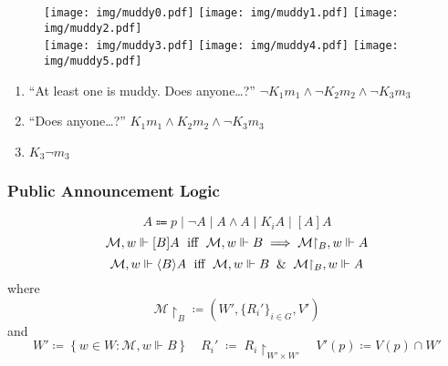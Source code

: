 \documentclass[UTF8,aspectratio=43,11pt,colorlinks,compress,openany]{beamer}%
\begin{document}
\begin{frame}\frametitle{}
\begin{figure}[H]
\texttt{[image: img/muddy0.pdf]}
\texttt{[image: img/muddy1.pdf]}
\texttt{[image: img/muddy2.pdf]}\\
\texttt{[image: img/muddy3.pdf]}
\texttt{[image: img/muddy4.pdf]}\hspace*{2ex}
\texttt{[image: img/muddy5.pdf]}
\end{figure}
\begin{enumerate}
	\item ``At least one is muddy. Does anyone\dots?'' $\neg K_1m_1\wedge\neg K_2m_2\wedge\neg K_3m_3$
	\item ``Does anyone\dots?'' $K_1m_1\wedge K_2m_2\wedge\neg K_3m_3$
	\item $K_3\neg m_3$
\end{enumerate}
\end{frame}

\begin{frame}\frametitle{Public Announcement Logic}
\[A\Coloneqq p\mid \neg A\mid A\wedge A\mid K_i A\mid [A]A\]
\[\mathcal{M},w\Vdash[B]A \mbox{\; iff \;} \mathcal{M},w\Vdash B\implies\mathcal{M}{\restriction_B},w\Vdash A\]
\[\mathcal{M},w\Vdash\langle B\rangle A \mbox{\; iff \;} \mathcal{M},w\Vdash B\;\;\&\;\;\mathcal{M}{\restriction_B},w\Vdash A\]
where
\[\mathcal{M}{\restriction_B}\coloneqq \left(W',\{R_i'\}_{i\in G},V'\right)\] and 
\[W'\coloneqq \left\{w\in W: \mathcal{M},w\Vdash B\right\}\quad R_i'\;\coloneqq \;R_i\!{\restriction_{W'\times W'}} \quad V'(p)\coloneqq V(p)\cap W'\]
\end{frame}
\end{document}

